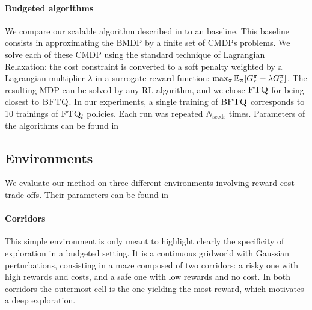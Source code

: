 \documentclass{article}
\begin{document}
\paragraph{Budgeted algorithms}\label{par:ex-brl} We compare our  scalable \BFTQ algorithm described in  to an \FTQl baseline. This baseline consists in approximating the BMDP by a finite set of CMDPs problems. We solve each of these CMDP using the standard technique of Lagrangian Relaxation: the cost constraint is converted to a soft penalty weighted by a Lagrangian multiplier $\lambda$ in a surrogate reward function: $\max_{\pi} \operatorname*{\mathbb{E}}_{\pi}[G_r^\pi - \lambda G_c^\pi]$. The resulting MDP can be solved by any RL algorithm, and we chose $\textrm{\textsc{FTQ}}$ for being closest to $\textrm{\textsc{BFTQ}}$.
In our experiments, a single training of $\textrm{\textsc{BFTQ}}$ corresponds to 10 trainings of $\textrm{\textsc{FTQ}}_l$ policies. Each run was repeated $N_{\text{seeds}}$ times. Parameters of the algorithms can be found in 

\subsection{Environments}
\label{subsec:environments}
We evaluate our method on three different environments involving reward-cost trade-offs. Their parameters can be found in 

\paragraph{Corridors}
This simple environment is only meant to highlight clearly the specificity of exploration in a budgeted setting. It is a continuous gridworld with Gaussian perturbations, consisting in a maze composed of two corridors: a risky one with high rewards and costs, and a safe one with low rewards and no cost. In both corridors the outermost cell is the one yielding the most reward, which motivates a deep exploration.
\end{document}

